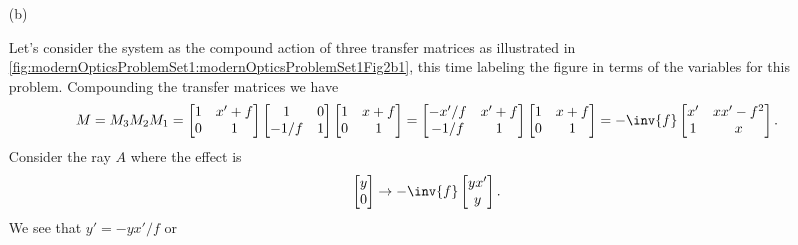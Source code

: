 {\begin{enumerate}
as expected.

\item[(b)]

Let's consider the system as the compound action of three transfer matrices as illustrated in \cref{fig:modernOpticsProblemSet1:modernOpticsProblemSet1Fig2b1}, this time labeling the figure in terms of the variables for this problem.
%
%
Compounding the transfer matrices we have
%
\begin{dmath}\label{eqn:modernOpticsProblemSet1P1:1510}
M
= M_3 M_2 M_1
=
\begin{bmatrix}
1 & x' + f \\
0 & 1
\end{bmatrix}
\begin{bmatrix}
1 & 0 \\
-1/f & 1
\end{bmatrix}
\begin{bmatrix}
1 & x + f \\
0 & 1
\end{bmatrix}
=
\begin{bmatrix}
-x'/f & x' + f \\
-1/f & 1
\end{bmatrix}
\begin{bmatrix}
1 & x + f \\
0 & 1
\end{bmatrix}
=
-\inv{f}
\begin{bmatrix}
x' & x x' - f^2 \\
1 & x
\end{bmatrix}.
\end{dmath}
%
Consider the ray \(A\) where the effect is
%
\begin{equation}\label{eqn:modernOpticsProblemSet1P1:1530}
\begin{bmatrix}
y \\
0
\end{bmatrix}
\rightarrow
-\inv{f}
\begin{bmatrix}
y x' \\
y
\end{bmatrix}.
\end{equation}
%
We see that \(y' = -y x'/f\) or
%


\end{enumerate}}
